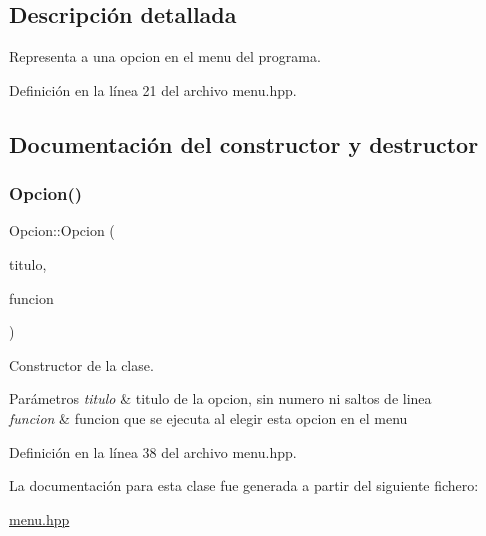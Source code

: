 \subsection{Descripción detallada}
Representa a una opcion en el menu del programa. 

Definición en la línea 21 del archivo menu.\+hpp.



\subsection{Documentación del constructor y destructor}
\mbox{\label{classOpcion_aca1ec1590d4a27e91615ec8af53d2824}} 
\subsubsection{\texorpdfstring{Opcion()}{Opcion()}}
{\footnotesize\ttfamily Opcion\+::\+Opcion (\begin{DoxyParamCaption}\item[{std\+::string}]{titulo,  }\item[{std\+::function$<$ bool(\hyperlink{classArbolAVL}{Arbol\+A\+VL} $\ast$a)$>$ $\ast$}]{funcion }\end{DoxyParamCaption})\hspace{0.3cm}{\ttfamily [inline]}}



Constructor de la clase. 


\begin{DoxyParams}{Parámetros}
{\em titulo} & titulo de la opcion, sin numero ni saltos de linea \\
\hline
{\em funcion} & funcion que se ejecuta al elegir esta opcion en el menu \\
\hline
\end{DoxyParams}


Definición en la línea 38 del archivo menu.\+hpp.



La documentación para esta clase fue generada a partir del siguiente fichero\+:\begin{DoxyCompactItemize}
\item 
\hyperlink{menu_8hpp}{menu.\+hpp}\end{DoxyCompactItemize}
